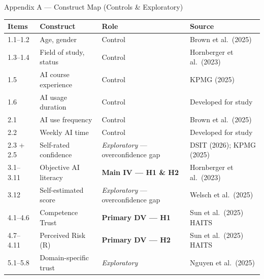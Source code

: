 \documentclass[10pt,aspectratio=169]{beamer}
\begin{document}
\begin{frame}{Appendix A --- Construct Map (Controls \& Exploratory)}
  \small
  \begin{tabular}{lllp{3.6cm}}
    \toprule
    \textbf{Items} & \textbf{Construct} & \textbf{Role} & \textbf{Source} \\
    \midrule
    1.1--1.2 & Age, gender            & Control            & Brown et al.\ (2025) \\
    1.3--1.4 & Field of study, status & Control            & Hornberger et al.\ (2023) \\
    1.5      & AI course experience   & Control            & KPMG (2025) \\
    1.6      & AI usage duration      & Control            & Developed for study \\
    \midrule
    2.1      & AI use frequency       & Control            & Brown et al.\ (2025) \\
    2.2      & Weekly AI time         & Control            & Developed for study \\
    2.3 + 2.5    & Self-rated confidence  & \textit{Exploratory} --- overconfidence gap & DSIT (2026); KPMG (2025) \\
    \midrule
    3.1--3.11 & Objective AI literacy & \textbf{Main IV --- H1 \& H2} & Hornberger et al.\ (2023) \\
    3.12     & Self-estimated score   & \textit{Exploratory} --- overconfidence gap & Welsch et al.\ (2025) \\
    \midrule
    4.1--4.6  & Competence Trust      & \textbf{Primary DV --- H1} & Sun et al.\ (2025) HAITS \\
    4.7--4.11 & Perceived Risk (R)    & \textbf{Primary DV --- H2} & Sun et al.\ (2025) HAITS \\
    \midrule
    5.1--5.8  & Domain-specific trust & \textit{Exploratory} & Nguyen et al.\ (2025) \\
    \bottomrule
  \end{tabular}
\end{frame}

\end{document}
